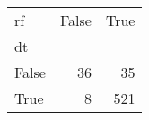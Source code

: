\begin{tabular}{lrr}
\toprule
rf &  False &  True  \\
dt    &        &        \\
\midrule
False &     36 &     35 \\
True  &      8 &    521 \\
\bottomrule
\end{tabular}
